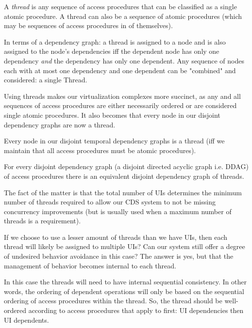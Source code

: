 \begin{con-def}[Thread]
	\label{thread}
	A \textit{thread} is any sequence of access procedures that can be classified as a single atomic procedure. A thread can also be a  sequence of atomic procedures (which may be sequences of access procedures in of themselves).
\end{con-def}

In terms of a dependency graph: a thread is assigned to a node and is also assigned to the node's dependencies iff the dependent node has only one dependency \textit{and} the dependency has only one dependent. Any sequence of nodes each with at most one dependency and one dependent can be "combined" and considered: a single Thread.

Using threads makes our virtualization complexes more succinct, as any and all sequences of access procedures are either necessarily ordered or are considered single atomic procedures. It also becomes that every node in our disjoint dependency graphs are now a thread.

\begin{props}
	\label{nodes-are-threads}
	Every node in our disjoint temporal dependency graphs is a thread (iff we maintain that all access procedures must be atomic procedures).
\end{props}

\begin{con-cor}
	\label{thread-ddag}
	For every disjoint dependency graph (a disjoint directed acyclic graph i.e. DDAG) of access procedures there is an equivalent disjoint dependency graph of threads.
\end{con-cor}

The fact of the matter is that the total number of UIs determines the minimum number of threads required to allow our CDS system to not be missing concurrency improvements (but is usually used when a maximum number of threads is a requirement).

If we choose to use a lesser amount of threads than we have UIs, then each thread will likely be assigned to multiple UIs? Can our system still offer a degree of undesired behavior avoidance in this case? The answer is yes, but that the management of behavior becomes internal to each thread.

In this case the threads will need to have internal sequential consistency. In other words, the ordering of dependent operations will only be based on the sequential ordering of access procedures within the thread. So, the thread should be well-ordered according to access procedures that apply to first: UI dependencies then UI dependents.

